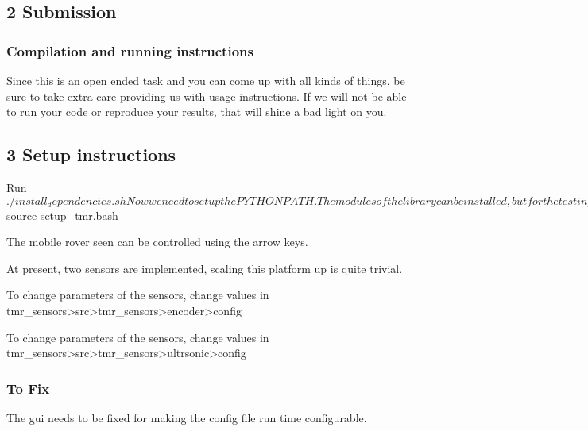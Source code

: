 \subsection*{2 Submission}

\subsubsection*{Compilation and running instructions}

Since this is an open ended task and you can come up with all kinds of things, be sure to take extra care providing us with usage instructions. If we will not be able to run your code or reproduce your results, that will shine a bad light on you.

\subsection*{3 Setup instructions}

\begin{DoxyVerb}Run $./install_dependencies.sh

Now we need to setup the PYTHONPATH. The modules of the library can be installed, but for the testing, just source the following file.

Run $source setup_tmr.bash

The mobile rover seen can be controlled using the arrow keys.

At present, two sensors are implemented, scaling this platform up is quite trivial.

To change parameters of the sensors, change values in tmr_sensors>src>tmr_sensors>encoder>config

To change parameters of the sensors, change values in tmr_sensors>src>tmr_sensors>ultrsonic>config
\end{DoxyVerb}


\subsubsection*{To Fix}

\begin{DoxyVerb}The gui needs to be fixed for making the config file run time configurable. \end{DoxyVerb}
 